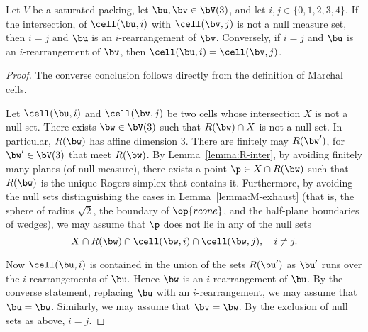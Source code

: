 \begin{lemma}[]\label{lemma:marchal-equal} 
Let $V$ be a saturated packing, 
let $\bu,\bv\in \bV(3)$, and let $i,j\in \{0,1,2,3,4\}$.
If the intersection, of
$\cell(\bu,i)$ with $\cell(\bv,j)$ is not a null measure set,
then $i=j$ and $\bu$ is an $i$-rearrangement of $\bv$.
Conversely, if $i=j$ and $\bu$ is an $i$-rearrangement of $\bv$, 
then $\cell(\bu,i)=\cell(\bv,j)$.
\end{lemma}

\begin{proof} 
The converse conclusion follows directly from the definition of Marchal cells.

Let $\cell(\bu,i)$ and $\cell(\bv,j)$ be two cells whose intersection $X$ is
not a null set.  There exists $\bw\in \bV(3)$ such that $R(\bw)\cap X$
is not a null set.  In particular, $R(\bw)$ has affine dimension $3$.  There are finitely
may $R(\bw')$, for $\bw'\in \bV(3)$ that meet $R(\bw)$.  
By Lemma~\ref{lemma:R-inter}, by avoiding finitely many planes (of null measure),
there exists a point $\p\in X\cap R(\bw)$ such that $R(\bw)$ is the unique
Rogers simplex that contains it.  Furthermore, by avoiding the null sets distinguishing
the cases in Lemma~\ref{lemma:M-exhaust} (that is, the sphere of radius $\sqrt2$,
the boundary of $\op{rcone}$, and the half-plane boundaries of wedges), we
may assume that $\p$ does not lie in any of the null sets
\begin{displaymath} 
X\cap R(\bw)\cap\cell(\bw,i)\cap \cell(\bw,j),\quad i\ne j.
\end{displaymath} 


Now $\cell(\bu,i)$ is contained in the union of the sets $R(\bu')$ as $\bu'$ runs over the
$i$-rearrangements of $\bu$.  Hence $\bw$ is an $i$-rearrangement of
$\bu$.  By the converse statement, replacing $\bu$ with an
$i$-rearrangement, we may assume that $\bu=\bw$.  Similarly, we may
assume that $\bv=\bw$.  By the exclusion of null sets as above, $i=j$.
\end{proof}

